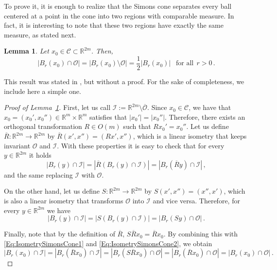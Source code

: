 \documentclass[12pt,reqno]{amsart}
\newtheorem{lemma}[theorem]{Lemma}
\theoremstyle{definition}
\theoremstyle{remark}
\newcommand{\con}[1]{\mathbb{#1}}
\newcommand{\R}{\con{R}} %
\newcommand{\ccal}{\mathscr{C}}
\newcommand{\ical}{\mathcal{I}}
\newcommand{\ocal}{\mathcal{O}}
\numberwithin{equation}{section}
\begin{document}
To prove it, it is enough to realize that the Simons cone separates every ball centered at a point in the cone into two regions with comparable measure. In fact, it is interesting to note that these two regions have exactly the same measure, as stated next.

\begin{lemma}
\label{Lemma:HalfBallSimonsCone}
Let $x_0\in \ccal\subset \R^{2m}$. Then, 
$$ | B_r(x_0)\cap \ocal| = | B_r(x_0)\setminus \ocal| = \frac{1}{2} |B_r(x_0)| \ \ \textrm{ for all} \ \ r>0\,. $$
\end{lemma}

This result was stated in \cite{Cabre-Saddle}, but without a proof. For the sake of completeness, we include here a simple one.

\begin{proof}[Proof of Lemma~\ref{Lemma:HalfBallSimonsCone}]
First, let us call $\ical := \R^{2m}\setminus \overline{\ocal}$. Since $x_0\in \ccal$, we have that $x_0 = (x_0',x_0'')\in \R^m \times \R^m$ satisfies that $|x_0'|=|x_0''|$. Therefore, there exists an orthogonal transformation $R\in O(m)$ such that $R  x_0' = x_0''$. Let us define $\overline{R}:\R^{2m}\to\R^{2m}$ by $\overline{R}(x',x'') = (R x',x'')$, which is a linear isometry that keeps invariant $\ocal$ and $\ical$. With these properties it is easy to check that for every $y\in \R^{2m}$ it holds
\begin{equation}
\label{Eq:IsometrySimonsCone1}
|B_r(y)\cap \ical| = |\overline{R} \left( B_r(y)\cap \ical\right)| = | B_r(\overline{R}y) \cap \ical |\,,
\end{equation}
and the same replacing $\ical$ with $\ocal$.

On the other hand, let us define $S:\R^{2m}\to\R^{2m}$ by $S(x',x'') = (x'',x')$, which is also a linear isometry that transforms $\ocal$ into $\ical$ and vice versa. Therefore, for every $y\in \R^{2m}$ we have
\begin{equation}
\label{Eq:IsometrySimonsCone2}
|B_r(y)\cap \ical| = |S \left( B_r(y)\cap \ical\right)| = | B_r(Sy) \cap \ocal |\,.
\end{equation}

Finally, note that by the definition of $\overline{R}$, $S\overline{R} x_0 = \overline{R} x_0$. By combining this with \eqref{Eq:IsometrySimonsCone1} and \eqref{Eq:IsometrySimonsCone2}, we obtain
$$ |B_r(x_0)\cap \ical| = | B_r(\overline{R}x_0) \cap \ical | = | B_r(S\overline{R}x_0) \cap \ocal | = | B_r(\overline{R}x_0) \cap \ocal | = |B_r(x_0)\cap \ocal|\,. $$
\end{proof}
\end{document}
